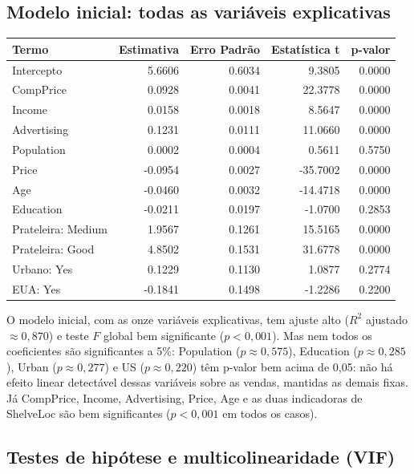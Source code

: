 \documentclass[a4paper]{modeloUFCG} %
\begin{document}
\subsection{Modelo inicial: todas as variáveis explicativas}\label{modelo-inicial-todas-as-variuxe1veis-explicativas}

\begin{tabular}{l|r|r|r|r}
\hline
Termo & Estimativa & Erro Padrão & Estatística t & p-valor\\
\hline
Intercepto & 5.6606 & 0.6034 & 9.3805 & 0.0000\\
\hline
CompPrice & 0.0928 & 0.0041 & 22.3778 & 0.0000\\
\hline
Income & 0.0158 & 0.0018 & 8.5647 & 0.0000\\
\hline
Advertising & 0.1231 & 0.0111 & 11.0660 & 0.0000\\
\hline
Population & 0.0002 & 0.0004 & 0.5611 & 0.5750\\
\hline
Price & -0.0954 & 0.0027 & -35.7002 & 0.0000\\
\hline
Age & -0.0460 & 0.0032 & -14.4718 & 0.0000\\
\hline
Education & -0.0211 & 0.0197 & -1.0700 & 0.2853\\
\hline
Prateleira: Medium & 1.9567 & 0.1261 & 15.5165 & 0.0000\\
\hline
Prateleira: Good & 4.8502 & 0.1531 & 31.6778 & 0.0000\\
\hline
Urbano: Yes & 0.1229 & 0.1130 & 1.0877 & 0.2774\\
\hline
EUA: Yes & -0.1841 & 0.1498 & -1.2286 & 0.2200\\
\hline
\end{tabular}

O modelo inicial, com as onze variáveis explicativas, tem ajuste alto (\(R^2\) ajustado \(\approx 0{,}870\)) e teste \(F\) global bem significante (\(p < 0{,}001\)). Mas nem todos os coeficientes são significantes a 5\%: Population (\(p \approx 0{,}575\)), Education (\(p \approx 0{,}285\)), Urban (\(p \approx 0{,}277\)) e US (\(p \approx 0{,}220\)) têm p-valor bem acima de 0,05: não há efeito linear detectável dessas variáveis sobre as vendas, mantidas as demais fixas. Já CompPrice, Income, Advertising, Price, Age e as duas indicadoras de ShelveLoc são bem significantes (\(p < 0{,}001\) em todos os casos).

\subsection{Testes de hipótese e multicolinearidade (VIF)}\label{testes-de-hipuxf3tese-e-multicolinearidade-vif}
\end{document}

